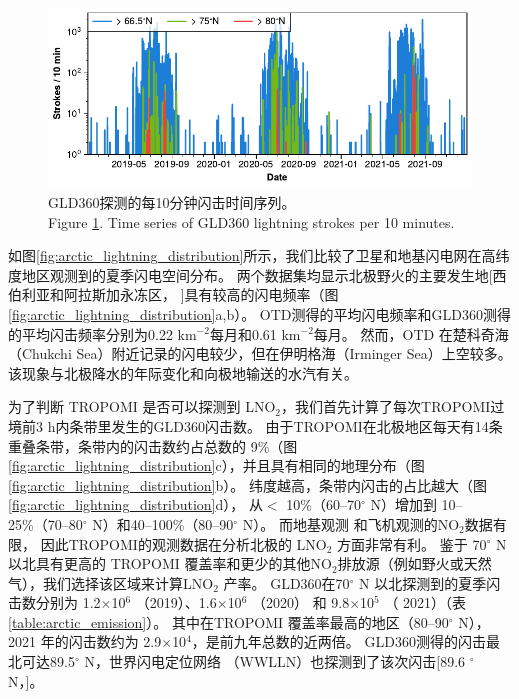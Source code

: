 \begin{figure}[!htbp]
\centering
\includegraphics[width=12cm]{./figures/arctic_gld360_tseries.pdf}
\caption{
GLD360探测的每10分钟闪击时间序列。\\
Figure \ref{fig:gld360_tseries}. Time series of GLD360 lightning strokes per 10 minutes.
}
\label{fig:gld360_tseries}
\end{figure}


如图\ref{fig:arctic_lightning_distribution}所示，我们比较了卫星和地基闪电网在高纬度地区观测到的夏季闪电空间分布。
两个数据集均显示北极野火的主要发生地[西伯利亚和阿拉斯加永冻区，
\citep{McCarty.2021}]具有较高的闪电频率（图\ref{fig:arctic_lightning_distribution}a,b）。
OTD测得的平均闪电频率和GLD360测得的平均闪击频率分别为0.22 km$^{-2}$每月和0.61 km$^{-2}$每月。
然而，OTD 在楚科奇海（Chukchi Sea）附近记录的闪电较少，但在伊明格海（Irminger Sea）上空较多。
该现象与北极降水的年际变化和向极地输送的水汽有关\citep{Bintanja.2020}。

为了判断 TROPOMI 是否可以探测到 LNO$_2$，我们首先计算了每次TROPOMI过境前3 h内条带里发生的GLD360闪击数。
由于TROPOMI在北极地区每天有14条重叠条带，条带内的闪击数约占总数的 9\%（图\ref{fig:arctic_lightning_distribution}c），并且具有相同的地理分布（图\ref{fig:arctic_lightning_distribution}b）。
纬度越高，条带内闪击的占比越大（图\ref{fig:arctic_lightning_distribution}d），
从$<$ 10\%（60--70$^{\circ}$ N）增加到 10--25\%（70--80$^{\circ}$ N）和40--100\%（80--90$^{\circ}$ N）。
而地基观测\citep{Schmale.2018} 和飞机观测\citep{Jacob.2010}的NO$_2$数据有限，
因此TROPOMI的观测数据在分析北极的 LNO$_2$ 方面非常有利。
鉴于 70$^{\circ}$ N 以北具有更高的 TROPOMI 覆盖率和更少的其他NO$_2$排放源（例如野火或天然气），我们选择该区域来计算LNO$_2$ 产率。
GLD360在70$^{\circ}$ N 以北探测到的夏季闪击数分别为 1.2$\times$10$^6$ （2019）、1.6$\times$10$^6$ （2020） 和 9.8$\times$10$^5$ （ 2021）（表\ref{table:arctic_emission}）。
其中在TROPOMI 覆盖率最高的地区（80--90$^{\circ}$ N），2021 年的闪击数约为 2.9$\times$10$^4$，是前九年总数的近两倍\citep{networktotal.2021}。
GLD360测得的闪击最北可达89.5$^{\circ}$ N，世界闪电定位网络 （WWLLN）也探测到了该次闪击[89.6 $^{\circ}$ N，\citet{Holzworth.2021}]。


